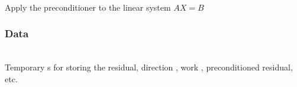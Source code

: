\documentclass[11pt]{article}
\begin{document}
     \\
    Apply the preconditioner to the linear system $AX = B$

\subsubsection{ Data}

     \\ Temporary
    s for storing the residual, direction
    , work , preconditioned residual, etc.


\end{document}
